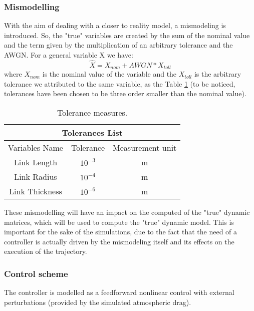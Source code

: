 \subsubsection{Mismodelling}
With the aim of dealing with a closer to reality model, a mismodeling is introduced. So, the "true" variables are created by the sum of the nominal value and the term given by the multiplication of an arbitrary tolerance and the AWGN. For a general variable X we have:
$$\hat X = X_{nom} + AWGN*X_{toll} $$
where $X_{nom}$ is the nominal value of the variable and the $X_{toll}$ is the arbitrary tolerance we attributed to the same variable, as the Table \ref{tab:TAB} (to be noticed, tolerances have been chosen to be three order smaller than the nominal value).

\begin{table}[!h]
\begin{center}
\begin{tabular}{||c c c||} 
     \hline
    \multicolumn{3}{|c|}{Tolerances List} \\
    \hline
    Variables Name& Tolerance &Measurement unit\\
    \hline
     Link Length & $10^{-3}$ & m\\
     Link Radius & $10^{-4}$ & m\\
     Link Thickness & $10^{-6}$ & m\\
    \hline
\end{tabular}
\caption{\label{tab:TAB} Tolerance measures.}
\end{center}
\end{table}

These mismodelling will have an impact on the computed of the "true" dynamic matrices, which will be used to compute the "true" dynamic model. This is important for the sake of the simulations, due to the fact that the need of a controller is actually driven by the mismodeling itself and its effects on the execution of the trajectory.


\subsubsection{Control scheme}
The controller is modelled as a feedforward nonlinear control with external perturbations (provided by the simulated atmospheric drag).\\

